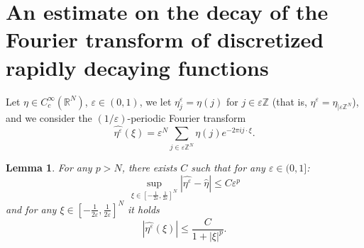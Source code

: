 \documentclass[10pt]{amsart}
\theoremstyle{plain}
\newtheorem{lemma}[theorem]{Lemma}
\theoremstyle{definition}
\newcommand{\R}{\mathbb{R}}
\newcommand{\Z}{\mathbb{Z}}
\newcommand{\e}{\varepsilon}
\numberwithin{equation}{section}
\begin{document}
\appendix
\section{An estimate on the decay of the Fourier
  transform of discretized rapidly decaying functions}
 Let $\eta\in C_c^\infty(\R^N)$, $\e \in (0,1)$,
we let $\eta^\e_j = \eta(j)$ for $j\in\e\Z$ (that is, $\eta^\e=\eta_{|\e\Z^N}$), and
we consider the $(1/\e)$-periodic Fourier transform
\[\widehat{\eta^\e}(\xi) = \e^N \sum_{j\in\e\Z^N} \eta(j)e^{-2\pi i j\cdot\xi}.\]
\begin{lemma}\label{lem:uniformSchwartz}
  For any $p>N$, there exists $C$ such that for any $\e\in (0,1]$:
  \begin{equation}\label{uniform}
    \sup_{\xi\in [-\frac{1}{2\e},\frac{1}{2\e}]^N}|\widehat{\eta^\e}-\widehat{\eta}|\le C\e^p
  \end{equation}
  and  for any $\xi\in [-\frac{1}{2\e},\frac{1}{2\e}]^N$ it holds 
  \begin{equation}\label{Schwartz}
       |\widehat{\eta^\e}(\xi)|\le \frac{C}{1+|\xi|^p}.
     \end{equation}
\end{lemma}
\end{document}
